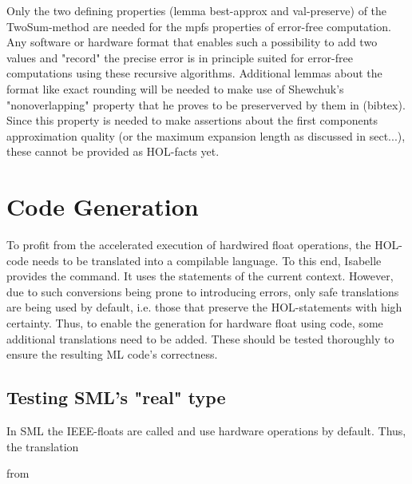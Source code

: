 \documentclass[11pt,a4paper]{article}
\begin{document}
Only the two defining properties (lemma best-approx and val-preserve) of the TwoSum-method are needed for the mpfs properties of error-free computation. Any software or hardware format that enables such a possibility to add two values and "record" the precise error is in principle suited for error-free computations using these recursive algorithms. Additional lemmas about the format like exact rounding will be needed to make use of Shewchuk's "nonoverlapping" property that he proves to be preserverved by them in (bibtex). Since this property is needed to make assertions about the first components approximation quality (or the maximum expansion length as discussed in sect...), these cannot be provided as HOL-facts yet.

\section{Code Generation}
To profit from the accelerated execution of hardwired float operations, the HOL-code needs to be translated into a compilable language. To this end, Isabelle provides the
command. It uses the 
statements of the current context. However, due to such conversions being prone to introducing errors, only safe translations are being used by default, i.e. those that preserve the HOL-statements with high certainty. Thus, to enable the generation for hardware float using code, some additional translations need to be added. These should be tested thoroughly to ensure the resulting ML code's correctness.

\subsection{Testing SML's "real" type}

In SML the IEEE-floats are called
and use hardware operations by default. Thus, the translation

from
 
\end{document}
